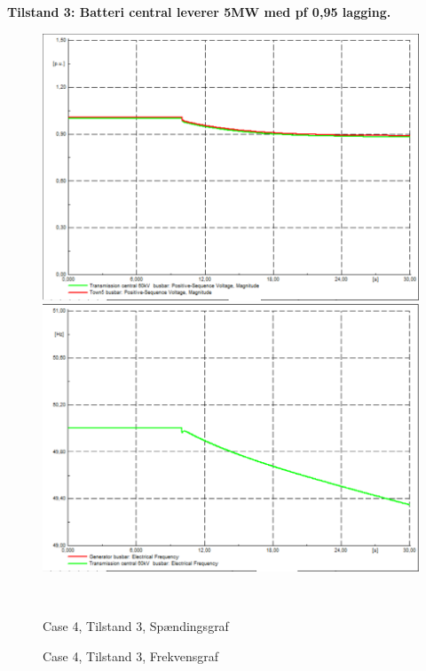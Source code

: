 \textbf{Tilstand 3: Batteri central leverer 5MW med pf 0,95 lagging.}
\begin{figure}[H]
	\centering
	\begin{minipage}[b]{0.48\textwidth}
		\centering
		\includegraphics[width=1.00\textwidth]{figurer/LargeDisturbanceBatterypark/Voltage3} %
	\end{minipage}
	\hfill
	\begin{minipage}[b]{0.48\textwidth}
		\centering
		\includegraphics[width=1.00\textwidth]{figurer/LargeDisturbanceBatterypark/Freq3} %
	\end{minipage}
	\\ %
	\begin{minipage}[t]{0.48\textwidth}
		\caption{Case 4, Tilstand 3, Spændingsgraf} %
		\label{fig:C4T3V}
	\end{minipage}
	\hfill
	\begin{minipage}[t]{0.48\textwidth}
		\caption{Case 4, Tilstand 3, Frekvensgraf} %
		\label{fig:C4T3F}
	\end{minipage}
\end{figure}

